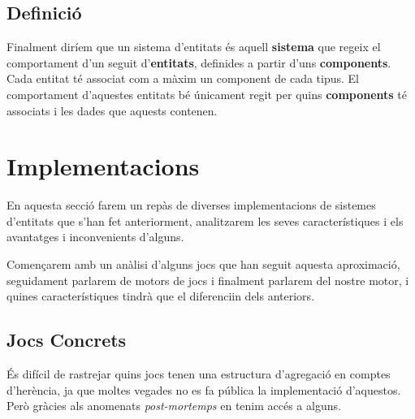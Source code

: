 \subsection{Definició}

Finalment diríem que un sistema d'entitats és aquell {\bf sistema} que regeix el comportament d'un seguit d'{\bf entitats}, definides a partir d'uns {\bf components}. Cada entitat té associat com a màxim un component de cada tipus. El comportament d'aquestes entitats bé únicament regit per quins {\bf components} té associats i les dades que aquests contenen.

\section{Implementacions}

En aquesta secció farem un repàs de diverses implementacions de sistemes d'entitats que s'han fet anteriorment, analitzarem les seves característiques i els avantatges i inconvenients d'alguns.

Començarem amb un anàlisi d'alguns jocs que han seguit aquesta aproximació, seguidament parlarem de motors de jocs i finalment parlarem del nostre motor, i quines característiques tindrà que el diferenciin dels anteriors.

\subsection{Jocs Concrets}

És difícil de rastrejar quins jocs tenen una estructura d'agregació en comptes d'herència, ja que moltes vegades no es fa pública la implementació d'aquestos. Però gràcies als anomenats {\em post-mortemps} en tenim accés a alguns.

